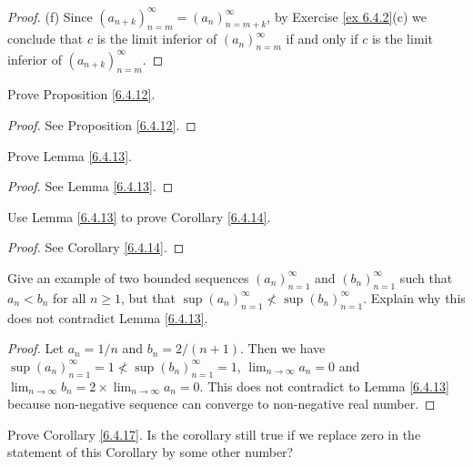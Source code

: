 \begin{proof}{(f)}
    Since \((a_{n + k})_{n = m}^\infty = (a_n)_{n = m + k}^\infty\), by Exercise \ref{ex 6.4.2}(c) we conclude that \(c\) is the limit inferior of \((a_n)_{n = m}^\infty\) if and only if \(c\) is the limit inferior of \((a_{n + k})_{n = m}^\infty\).
\end{proof}

\begin{exercise}\label{ex 6.4.3}
    Prove Proposition \ref{6.4.12}.
\end{exercise}

\begin{proof}
    See Proposition \ref{6.4.12}.
\end{proof}

\begin{exercise}\label{ex 6.4.4}
    Prove Lemma \ref{6.4.13}.
\end{exercise}

\begin{proof}
    See Lemma \ref{6.4.13}.
\end{proof}

\begin{exercise}\label{ex 6.4.5}
    Use Lemma \ref{6.4.13} to prove Corollary \ref{6.4.14}.
\end{exercise}

\begin{proof}
    See Corollary \ref{6.4.14}.
\end{proof}

\begin{exercise}\label{ex 6.4.6}
    Give an example of two bounded sequences \((a_n)_{n = 1}^\infty\) and \((b_n)_{n = 1}^\infty\) such that \(a_n < b_n\) for all \(n \geq 1\), but that \(\sup(a_n)_{n = 1}^\infty \not< \sup(b_n)_{n = 1}^\infty\).
    Explain why this does not contradict Lemma \ref{6.4.13}.
\end{exercise}

\begin{proof}
    Let \(a_n = 1 / n\) and \(b_n = 2 / (n + 1)\).
    Then we have \(\sup(a_n)_{n = 1}^\infty = 1 \not < \sup(b_n)_{n = 1}^\infty = 1\), \(\lim_{n \to \infty} a_n = 0\) and \(\lim_{n \to \infty} b_n = 2 \times \lim_{n \to \infty} a_n = 0\).
    This does not contradict to Lemma \ref{6.4.13} because non-negative sequence can converge to non-negative real number.
\end{proof}

\begin{exercise}\label{ex 6.4.7}
    Prove Corollary \ref{6.4.17}.
    Is the corollary still true if we replace zero in the statement of this Corollary by some other number?
\end{exercise}

